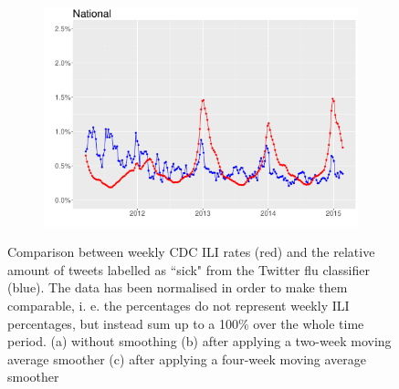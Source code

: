 \documentclass[11pt, a4paper,twoside]{report}\usepackage[]{graphicx}\usepackage[]{color}
\begin{document}
\begin{figure}[H]
  \begin{subfigure}[t]{0.6\textwidth}
  \includegraphics[width=1\linewidth,height=0.5\linewidth]{cdc_twitter_comp_nat_ma4.pdf}
  \caption{}
  \label{fig:cdc_tw_comp_nat_ma4}
  \end{subfigure}
  \caption{Comparison between weekly CDC ILI rates (red) and the relative amount of tweets labelled as ``sick" from the Twitter flu classifier (blue). The data has been normalised in order to make them comparable, i. e. the percentages do not represent weekly ILI percentages, but instead sum up to a 100\% over the whole time period. (a) without smoothing (b) after applying a two-week moving average smoother (c) after applying a four-week moving average smoother}
  \label{fig:cdc_tw_comp_nat_tot}
\end{figure}
\end{document}
